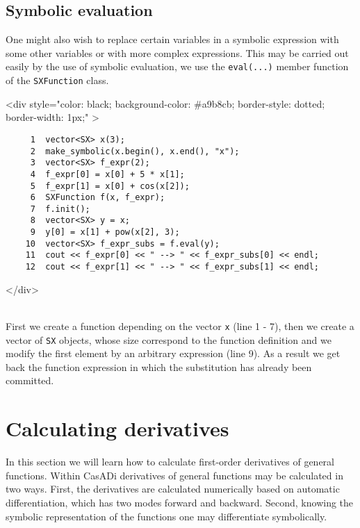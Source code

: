 \documentclass[a4paper,12pt]{book}
\newcommand{\codebegin}{
\begin{rawhtml}
<div style="color: black; background-color: \#a9b8cb;  border-style: dotted; border-width: 1px;" >
\end{rawhtml}
}
\newcommand{\codeend}{
\begin{rawhtml}
</div>
\end{rawhtml}
}
\begin{document}
{ \subsection*{Symbolic evaluation}
 \par\noindent
 One might also wish to replace certain variables in a symbolic expression with some other variables
  or with more complex expressions. This may be carried out easily by the use of symbolic evaluation, we use
  the \texttt{eval(...)} member function of the \texttt{SXFunction} class.
\par
\codebegin
\begin{verbatim}
     1  vector<SX> x(3);
     2  make_symbolic(x.begin(), x.end(), "x");
     3  vector<SX> f_expr(2);
     4  f_expr[0] = x[0] + 5 * x[1];
     5  f_expr[1] = x[0] + cos(x[2]);
     6  SXFunction f(x, f_expr);
     7  f.init();
     8  vector<SX> y = x;
     9  y[0] = x[1] + pow(x[2], 3);
    10  vector<SX> f_expr_subs = f.eval(y);
    11  cout << f_expr[0] << " --> " << f_expr_subs[0] << endl;
    12  cout << f_expr[1] << " --> " << f_expr_subs[1] << endl;
\end{verbatim}
\codeend\\
First we create a function depending on the vector \texttt{x} (line 1 \-- 7), then we create a vector of \texttt{SX} objects, whose
size correspond to the function definition and we modify the first element by an arbitrary expression (line 9). As a result we get
back the function expression in which the substitution has already been committed.
\section{Calculating derivatives}
In this section we will learn how to calculate first-order derivatives of general functions. Within CasADi derivatives of general
functions may be calculated in two ways. First, the derivatives are calculated numerically based on automatic differentiation,
 which has two modes forward and backward. Second, knowing the symbolic representation of the functions one may differentiate
 symbolically.

}
\end{document}
